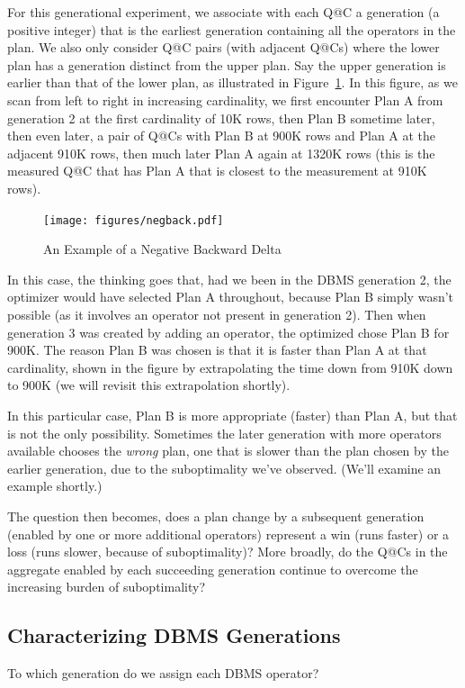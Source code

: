 \documentclass[prodmode,acmtods]{acmsmall}
\begin{document}
For this generational experiment, we associate with each Q@C a generation
(a positive integer) that
is the earliest generation containing all the operators in the
plan. We also only consider Q@C pairs (with adjacent Q@Cs) where the lower
plan has a generation distinct from the upper plan.  Say the upper
generation is earlier than that of the lower plan, as illustrated in
Figure~\ref{fig:negback}. In this figure, as we scan from left to right in
increasing cardinality, we first encounter Plan A from generation 2 at the
first cardinality of 10K rows, then Plan B sometime later, then even later,
a pair of Q@Cs with Plan B at 900K rows and Plan A at the
adjacent 910K rows, then much later Plan A again at 1320K rows (this is the
measured Q@C that has Plan A that is closest to the measurement at 910K rows).

\begin{figure}[t]
\texttt{[image: figures/negback.pdf]}
\caption{An Example of a Negative Backward Delta\label{fig:negback}}
\end{figure}

In this case, the thinking goes that, had we been
in the \hbox{DBMS} generation 2, the optimizer would have selected Plan A
throughout, because Plan B simply wasn't possible (as it involves an
operator not present in generation 2). Then when generation 3 was created by
adding an operator, the optimized chose Plan B for 900K. The reason Plan B
was chosen is that it is faster than Plan A at that cardinality, shown in
the figure by extrapolating the time down from 910K down to 900K (we will
revisit this extrapolation shortly).

In this particular case, Plan B is more appropriate (faster) than Plan A,
but that is not the only possibility. Sometimes the later generation with
more operators available chooses the {\em wrong} plan, one that is slower
than the plan chosen by the earlier generation, due to the suboptimality
we've observed. (We'll examine an example shortly.)

The question then becomes, does a plan change by a subsequent generation
(enabled by one or more additional operators) represent a win (runs faster)
or a loss (runs slower, because of suboptimality)? More broadly, do the Q@Cs
in the aggregate enabled by each succeeding generation continue to overcome
the increasing burden of suboptimality?

\subsection{Characterizing \hbox{DBMS} Generations}
To which generation do we assign each \hbox{DBMS} operator?
\end{document}
